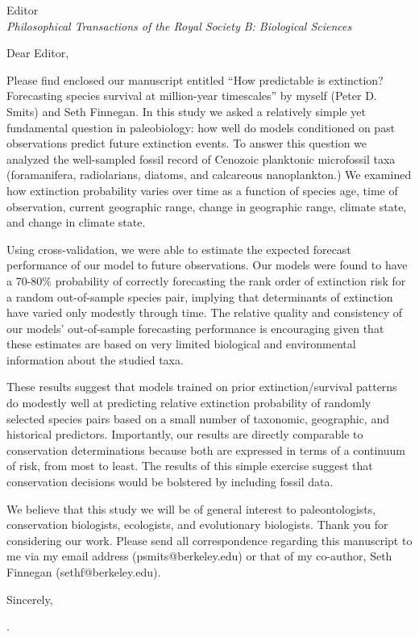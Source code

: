 \documentclass{letter}
\begin{document}
\begin{letter}{Editor \\ \textit{Philosophical Transactions of the Royal Society B: Biological Sciences}}
  \opening{Dear Editor,}

  Please find enclosed our manuscript entitled ``How predictable is extinction? Forecasting species survival at million-year timescales'' by myself (Peter D. Smits) and Seth Finnegan. In this study we asked a relatively simple yet fundamental question in paleobiology: how well do models conditioned on past observations predict future extinction events. To answer this question we analyzed the well-sampled fossil record of Cenozoic planktonic microfossil taxa (foramanifera, radiolarians, diatoms, and calcareous nanoplankton.) We examined how extinction probability varies over time as a function of species age, time of observation, current geographic range, change in geographic range, climate state, and change in climate state. 
  
  Using cross-validation, we were able to estimate the expected forecast performance of our model to future observations. Our models were found to have a 70-80\% probability of correctly forecasting the rank order of extinction risk for a random out-of-sample species pair, implying that determinants of extinction have varied only modestly through time. The relative quality and consistency of our models' out-of-sample forecasting performance is encouraging given that these estimates are based on very limited biological and environmental information about the studied taxa. 

  These results suggest that models trained on prior extinction/survival patterns do modestly well at predicting relative extinction probability of randomly selected species pairs based on a small number of taxonomic, geographic, and historical predictors. Importantly, our results are directly comparable to conservation determinations because both are expressed in terms of a continuum of risk, from most to least. The results of this simple exercise suggest that conservation decisions would be bolstered by including fossil data.

  We believe that this study we will be of general interest to paleontologists, conservation biologists, ecologists, and evolutionary biologists. Thank you for considering our work. Please send all correspondence regarding this manuscript to me via my email address (psmits@berkeley.edu) or that of my co-author, Seth Finnegan (sethf@berkeley.edu).

  \closing{Sincerely,}

  .

\end{letter}
\end{document}
